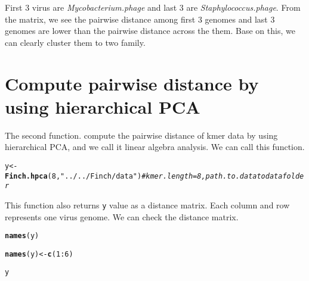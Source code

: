 \documentclass{article}\usepackage[]{graphicx}\usepackage[]{color}
\makeatletter
\newcommand{\hlnum}[1]{\textcolor[rgb]{0.686,0.059,0.569}{#1}}%
\newcommand{\hlstr}[1]{\textcolor[rgb]{0.192,0.494,0.8}{#1}}%
\newcommand{\hlcom}[1]{\textcolor[rgb]{0.678,0.584,0.686}{\textit{#1}}}%
\newcommand{\hlopt}[1]{\textcolor[rgb]{0,0,0}{#1}}%
\newcommand{\hlstd}[1]{\textcolor[rgb]{0.345,0.345,0.345}{#1}}%
\newcommand{\hlkwb}[1]{\textcolor[rgb]{0.69,0.353,0.396}{#1}}%
\newcommand{\hlkwd}[1]{\textcolor[rgb]{0.737,0.353,0.396}{\textbf{#1}}}%
\newenvironment{kframe}{%
 \def\at@end@of@kframe{}%
 \ifinner\ifhmode%
  \def\at@end@of@kframe{\end{minipage}}%
  \begin{minipage}{\columnwidth}%
 \fi\fi%
 \def\FrameCommand##1{\hskip\@totalleftmargin \hskip-\fboxsep
 \colorbox{shadecolor}{##1}\hskip-\fboxsep
     \hskip-\linewidth \hskip-\@totalleftmargin \hskip\columnwidth}%
 \MakeFramed {\advance\hsize-\width
   \@totalleftmargin\z@ \linewidth\hsize
   \@setminipage}}%
 {\par\unskip\endMakeFramed%
 \at@end@of@kframe}
\newenvironment{knitrout}{}{} %
\makeatother
\begin{document}
First 3 virus are \emph{Mycobacterium.phage} and last 3 are \emph{Staphylococcus.phage}. From the matrix, we see the pairwise distance among first 3 genomes and last 3 genomes are lower than the pairwise distance across the them. Base on this, we can clearly cluster them to two family.\\


\section{Compute pairwise distance by using hierarchical PCA}
\label{Finch.hpca}

The second function.  compute the pairwise distance of kmer data by using hierarchical PCA, and we call it linear algebra analysis. We can call this function.

\begin{knitrout}
\color{fgcolor}\begin{kframe}
\begin{alltt}
\hlstd{y} \hlkwb{<-} \hlkwd{Finch.hpca}\hlstd{(}\hlnum{8}\hlstd{,}\hlstr{"../../Finch/data"}\hlstd{)} \hlcom{#kmer.length = 8, path.to.data to data folder}
\end{alltt}


{\ttfamily\noindent\bfseries{}}\end{kframe}
\end{knitrout}

This function also  returns \texttt{y} value as a distance matrix. Each column and row represents one virus genome. We can check the distance matrix.

\begin{knitrout}
\color{fgcolor}\begin{kframe}
\begin{alltt}
\hlkwd{names}\hlstd{(y)}
\end{alltt}


{\ttfamily\noindent\bfseries\color{errorcolor}{\#\# Error in eval(expr, envir, enclos): object 'y' not found}}\begin{alltt}
\hlkwd{names}\hlstd{(y)} \hlkwb{<-} \hlkwd{c}\hlstd{(}\hlnum{1}\hlopt{:}\hlnum{6}\hlstd{)}
\end{alltt}


{\ttfamily\noindent\bfseries\color{errorcolor}{\#\# Error in names(y) <- c(1:6): object 'y' not found}}\begin{alltt}
\hlstd{y}
\end{alltt}


{\ttfamily\noindent\bfseries\color{errorcolor}{\#\# Error in eval(expr, envir, enclos): object 'y' not found}}\end{kframe}
\end{knitrout}
\end{document}
